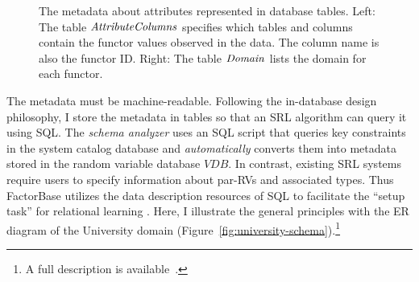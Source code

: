 \documentclass{sfuthesis}
\begin{document}
\begin{figure}[h] %
 \centering
{} 
\caption{ The metadata about attributes represented in \RVD database tables.  Left: The table $\it{AttributeColumns}$ specifies which tables and columns contain the functor values observed in the data. The column name is also the functor ID. Right: The table $\it{Domain}$ lists the domain for each functor.
}
 \label{fig:attributes}
\end{figure}


 
The metadata must be machine-readable. Following the in-database design philosophy, I  store the metadata in tables so that an SRL algorithm can query it using SQL. The {\em schema analyzer} uses an SQL script that queries key constraints in the system catalog database and {\em automatically} converts them into metadata stored in the random variable database $VDB$. In contrast, existing SRL systems require users to specify information about par-RVs and associated types. 
Thus FactorBase   utilizes the data description resources of SQL to facilitate the ``setup task'' for relational learning \cite{Walker2010}. 
Here, I  illustrate the general principles with the ER diagram of the University domain (Figure~\ref{fig:university-schema}).\footnote{A full description is available~\cite{Schulte2015}.
}
\end{document}
